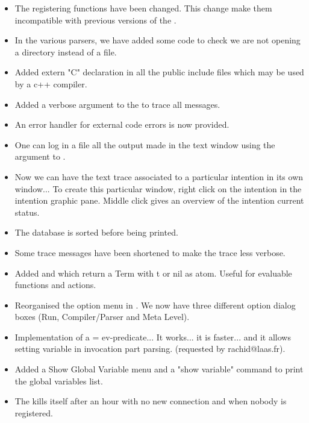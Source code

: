 \begin{itemize}
\item The \MP{} registering functions have been changed. This change make them
incompatible with previous versions of the \MP{}.

\item In the various parsers, we have added some code to check we are not
opening a directory instead of a file.

\item Added extern "C" declaration in all the public include files
which may be used by a c++ compiler.

\item Added a verbose argument  to the \MP{} to trace all messages.

\item An error handler for external code errors is now provided. 

\item One can log in a file all the output made in the \XOPRS{} text window
using the  argument to \XOPRS{}. 

\item Now we can have the text trace associated to a particular intention in
its own window... To create this particular window, right click on the
intention in the intention graphic pane. Middle click gives an overview of the
intention current status.

\item The database is sorted before being printed.

\item Some trace messages have been shortened to make the trace less
verbose.

\item Added  and  which return a Term with t or
nil as atom. Useful for evaluable functions and actions.

\item Reorganised the option menu in \XOPRS{}. We now have three different
option dialog boxes (Run, Compiler/Parser and Meta Level).

\item  Implementation of a = ev-predicate... It works... it is faster... and it
allows setting variable in invocation part parsing. (requested by
rachid@laas.fr).

\item Added a Show Global Variable menu and a "show variable" command to print
the global variables list. 

\item The \MP{} kills itself after an hour with no new connection and when
nobody is registered. 


\end{itemize}
